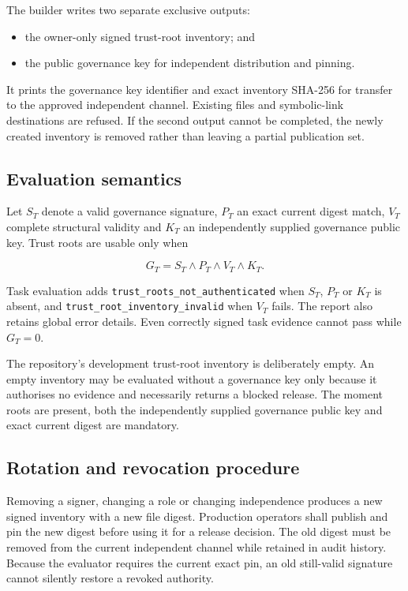 The builder writes two separate exclusive outputs:

\begin{itemize}
  \item the owner-only signed trust-root inventory; and
  \item the public governance key for independent distribution and pinning.
\end{itemize}

It prints the governance key identifier and exact inventory SHA-256 for transfer to
the approved independent channel.  Existing files and symbolic-link destinations
are refused.  If the second output cannot be completed, the newly created inventory
is removed rather than leaving a partial publication set.

\subsection{Evaluation semantics}

Let $S_T$ denote a valid governance signature, $P_T$ an exact current digest match,
$V_T$ complete structural validity and $K_T$ an independently supplied governance
public key.  Trust roots are usable only when

\begin{equation}
  G_T = S_T \land P_T \land V_T \land K_T.
\end{equation}

Task evaluation adds \texttt{trust\_roots\_not\_authenticated} when $S_T$, $P_T$ or
$K_T$ is absent, and \texttt{trust\_root\_inventory\_invalid} when $V_T$ fails.
The report also retains global error details.  Even correctly signed task evidence
cannot pass while $G_T=0$.

The repository's development trust-root inventory is deliberately empty.  An empty
inventory may be evaluated without a governance key only because it authorises no
evidence and necessarily returns a blocked release.  The moment roots are present,
both the independently supplied governance public key and exact current digest are
mandatory.

\subsection{Rotation and revocation procedure}

Removing a signer, changing a role or changing independence produces a new signed
inventory with a new file digest.  Production operators shall publish and pin the
new digest before using it for a release decision.  The old digest must be removed
from the current independent channel while retained in audit history.  Because the
evaluator requires the current exact pin, an old still-valid signature cannot
silently restore a revoked authority.

